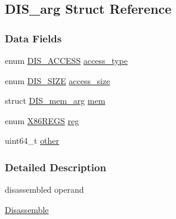 \hypertarget{struct_d_i_s__arg}{
\subsection{DIS\_\-arg Struct Reference}
\label{struct_d_i_s__arg}
}
\subsubsection*{Data Fields}
\begin{DoxyCompactItemize}
\item 
enum \hyperlink{bytecode__disasm_8h_a3dcc05be268362b3f772b1675e0a882c}{DIS\_\-ACCESS} \hyperlink{struct_d_i_s__arg_a5a7d33b48f73c1d560377f10471d8b00}{access\_\-type}
\item 
enum \hyperlink{bytecode__disasm_8h_a6a0d419b6b61630b1f76a25ff39df84d}{DIS\_\-SIZE} \hyperlink{struct_d_i_s__arg_abe85ed51a3596cdb3a868a284c3d961f}{access\_\-size}
\item 
struct \hyperlink{struct_d_i_s__mem__arg}{DIS\_\-mem\_\-arg} \hyperlink{struct_d_i_s__arg_a883edefb091b4875ffd7bb1f1e61dea3}{mem}
\item 
enum \hyperlink{bytecode__disasm_8h_a87af2e927a80478796188d9d8d813d82}{X86REGS} \hyperlink{struct_d_i_s__arg_a426daf7e6de8cea3128731107457d2cf}{reg}
\item 
uint64\_\-t \hyperlink{struct_d_i_s__arg_aabf8b24bd58cc13ea953e9add24d4387}{other}
\end{DoxyCompactItemize}


\subsubsection{Detailed Description}
disassembled operand \begin{Desc}
\item[\hyperlink{disasm__disasm000003}{Disassemble}]\end{Desc}


